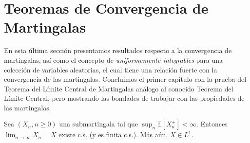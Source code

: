 \section{Teoremas de Convergencia de Martingalas}
En esta última sección presentamos resultados respecto a la convergencia de martingalas, así como el concepto de \emph{uniformemente integrables} para una colección de variables aleatorias, el cual tiene una relación fuerte con la convergencia de las martingalas. Concluimos el primer capítulo con la prueba del Teorema del Límite Central de Martingalas análogo al conocido Teorema del Límite Central, pero mostrando las bondades de trabajar con las propiedades de las martingalas.

\begin{theorem}
\label{conver1}
Sea $(X_n, n \geq 0)$ una submartingala tal que $\sup_n \mathbb{E}[X_n^{+}] < \infty$. Entonces $\lim_{n \rightarrow \infty} X_n = X$ existe c.s. (y es finita c.s.). Más aún, $X \in L^1$.
\end{theorem}
